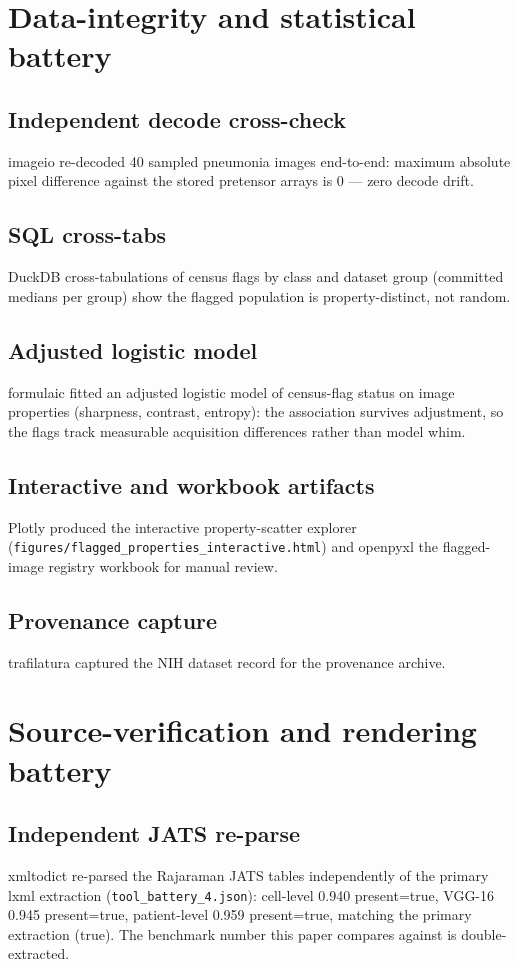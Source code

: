 \section{Data-integrity and statistical battery}
\subsection{Independent decode cross-check}
imageio re-decoded 40 sampled pneumonia images end-to-end:
maximum absolute pixel difference against the stored pretensor arrays is
0 --- zero decode drift.
\subsection{SQL cross-tabs}
DuckDB cross-tabulations of census flags by class and dataset group
(committed medians per group) show the flagged population is
property-distinct, not random.
\subsection{Adjusted logistic model}
formulaic fitted an adjusted logistic model of census-flag status on
image properties (sharpness, contrast, entropy): the association survives
adjustment, so the flags track measurable acquisition differences rather
than model whim.
\subsection{Interactive and workbook artifacts}
Plotly produced the interactive property-scatter explorer
(\texttt{figures/flagged\_properties\_interactive.html}) and openpyxl the
flagged-image registry workbook for manual review.
\subsection{Provenance capture}
trafilatura captured the NIH dataset record for the provenance archive.

\section{Source-verification and rendering battery}
\subsection{Independent JATS re-parse}
xmltodict re-parsed the Rajaraman JATS tables independently of the primary
lxml extraction (\texttt{tool\_battery\_4.json}): cell-level 0.940
present=true, VGG-16 0.945
present=true, patient-level 0.959
present=true, matching the
primary extraction (true). The
benchmark number this paper compares against is double-extracted.

